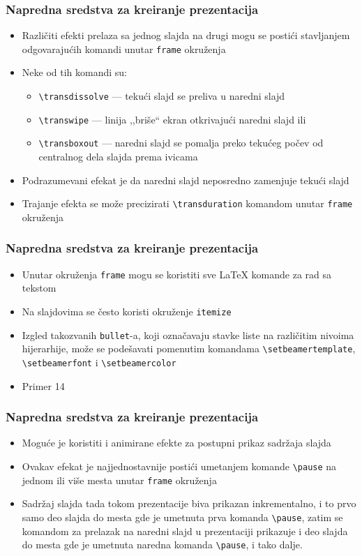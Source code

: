 \documentclass{beamer}
\begin{document}
\begin{frame}[fragile]\frametitle{Napredna sredstva za kreiranje prezentacija}
	\begin{itemize}	
		\item Različiti efekti prelaza sa jednog slajda na drugi mogu se postići stavljanjem odgovarajućih komandi unutar
		\verb"frame" okruženja 		
		\item	Neke od tih komandi su:
		\begin{itemize}
			\item  \verb"\transdissolve" --- tekući slajd se preliva u naredni slajd
			\item \verb"\transwipe" --- linija ,,briše`` ekran otkrivajući naredni slajd ili
			\item \verb"\transboxout" --- naredni slajd se pomalja preko tekućeg počev od centralnog dela slajda prema
			ivicama
		\end{itemize}		
		\item	Podrazumevani efekat je da naredni slajd neposredno zamenjuje tekući slajd 		
		\item	Trajanje efekta se može precizirati \verb"\transduration" komandom unutar \verb"frame" okruženja
	\end{itemize}
\end{frame}

\begin{frame}[fragile]\frametitle{Napredna sredstva za kreiranje prezentacija}
	\begin{itemize}	
		\item Unutar okruženja
		\verb"frame"
		mogu se koristiti sve \LaTeX{} komande za rad sa
		tekstom		
		\item	Na slajdovima se često koristi okruženje \verb"itemize"		
		\item	Izgled takozvanih \verb"bullet"-a, koji označavaju stavke liste na različitim nivoima
		hijerarhije, može se podešavati pomenutim komandama \verb"\setbeamertemplate", \verb"\setbeamerfont" i \verb"\setbeamercolor"
		\item \textcolor{beamer@darkred}{Primer 14}
	\end{itemize}
\end{frame}

\begin{frame}[fragile]\frametitle{Napredna sredstva za kreiranje prezentacija}
	\begin{itemize}	
		\item  Moguće je koristiti i animirane efekte za postupni prikaz sadržaja slajda		
		\item Ovakav efekat je najjednostavnije postići umetanjem komande \verb"\pause"
		na jednom ili više mesta unutar \verb"frame" okruženja		
		\item	Sadržaj slajda tada tokom prezentacije biva prikazan inkrementalno, i to prvo samo deo slajda do mesta gde je
		umetnuta prva komanda \verb"\pause", zatim se komandom za prelazak na naredni
		slajd u prezentaciji prikazuje i deo slajda do mesta gde je umetnuta naredna komanda
		\verb"\pause", i tako dalje.		
	\end{itemize}
\end{frame}
\end{document}

